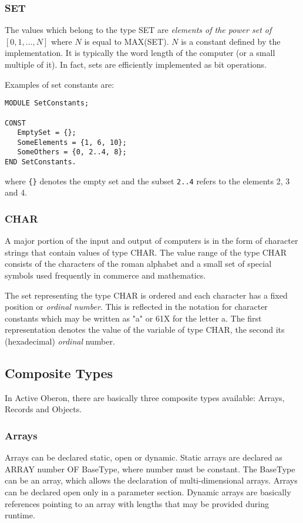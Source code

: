 \documentclass[a4paper,11pt]{article}
\begin{document}
\subsubsection{SET} \label{section:SetType}
The values which belong to the type SET are {\em elements of the power set of} $[0, 1, \ldots, N]$ where $N$ is equal to MAX(SET). $N$ is a constant defined by the implementation. It is typically the word length of the computer (or a small multiple of it). In fact, sets are efficiently implemented as bit operations.

Examples of set constants are:
\begin{lstlisting}[language=Oberon,frame=none,caption=Using set constants]
MODULE SetConstants;

CONST
   EmptySet = {};
   SomeElements = {1, 6, 10};
   SomeOthers = {0, 2..4, 8};
END SetConstants.
\end{lstlisting}

where \verb+{}+ denotes the empty set and the subset \verb+2..4+ refers to the elements 2, 3 and 4.

\subsubsection{CHAR}
A major portion of the input and output of computers is in the form of character strings that contain values of type CHAR. The value range of the type CHAR consists of the characters of the roman alphabet and a small set of special symbols used frequently in commerce and mathematics.

The set representing the type CHAR is ordered and each character has a fixed position or {\em ordinal number}. This is reflected in the notation for character constants which may be written as "a" or 61X for the letter a. The first representation denotes the value of the variable of type CHAR, the second its (hexadecimal) {\em ordinal} number.

\subsection{Composite Types}\label{section:CompositeTypes}

In Active Oberon, there are basically three composite types available: Arrays, Records and Objects.

\subsubsection{Arrays}\label{section:Arrays}
Arrays can be declared static, open or dynamic. Static arrays are declared as ARRAY number OF BaseType, where number must be constant. The BaseType can be an array, which allows the declaration of multi-dimensional arrays. Arrays can be declared open only in a parameter section. Dynamic arrays are basically references pointing to an array with lengths that may be provided during runtime.
\end{document}
